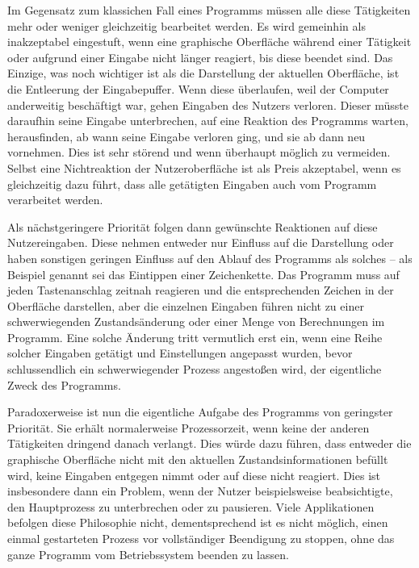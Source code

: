 Im Gegensatz zum klassichen Fall eines Programms müssen alle diese Tätigkeiten
mehr oder weniger gleichzeitig bearbeitet werden. Es wird gemeinhin als inakzeptabel
eingestuft, wenn eine graphische Oberfläche während einer Tätigkeit oder aufgrund
einer Eingabe nicht länger reagiert, bis diese beendet sind. Das Einzige, was
noch wichtiger ist als die Darstellung der aktuellen Oberfläche, ist die Entleerung
der Eingabepuffer. Wenn diese überlaufen, weil der Computer anderweitig beschäftigt
war, gehen Eingaben des Nutzers verloren. Dieser müsste daraufhin seine Eingabe
unterbrechen, auf eine Reaktion des Programms warten, herausfinden, ab wann seine
Eingabe verloren ging, und sie ab dann neu vornehmen. Dies ist sehr störend
und wenn überhaupt möglich zu vermeiden. Selbst eine Nichtreaktion der Nutzeroberfläche
ist als Preis akzeptabel, wenn es gleichzeitig dazu führt, dass alle getätigten
Eingaben auch vom Programm verarbeitet werden.

Als nächstgeringere Priorität folgen dann gewünschte Reaktionen auf diese Nutzereingaben.
Diese nehmen entweder nur Einfluss auf die Darstellung oder haben sonstigen
geringen Einfluss auf den Ablauf des Programms als solches -- als Beispiel genannt
sei das Eintippen einer Zeichenkette. Das Programm muss auf jeden Tastenanschlag
zeitnah reagieren und die entsprechenden Zeichen in der Oberfläche darstellen,
aber die einzelnen Eingaben führen nicht zu einer schwerwiegenden Zustandsänderung
oder einer Menge von Berechnungen im Programm. Eine solche Änderung tritt vermutlich 
erst ein, wenn eine Reihe solcher Eingaben getätigt und Einstellungen angepasst wurden, 
bevor schlussendlich ein \glqq{}schwerwiegender\grqq{} Prozess angestoßen wird,
der eigentliche Zweck des Programms.

Paradoxerweise ist nun die eigentliche Aufgabe des Programms von geringster Priorität. 
Sie erhält normalerweise Prozessorzeit, wenn keine der anderen Tätigkeiten dringend 
danach verlangt. Dies würde dazu führen, dass entweder die graphische Oberfläche
nicht mit den aktuellen Zustandsinformationen befüllt wird, keine Eingaben entgegen
nimmt oder auf diese nicht reagiert. Dies ist insbesondere dann ein Problem, wenn der
Nutzer beispielsweise beabsichtigte, den Hauptprozess zu unterbrechen oder zu pausieren.
Viele Applikationen befolgen diese Philosophie nicht, dementsprechend ist es nicht
möglich, einen einmal gestarteten Prozess vor vollständiger Beendigung zu stoppen,
ohne das ganze Programm vom Betriebssystem beenden zu lassen.

